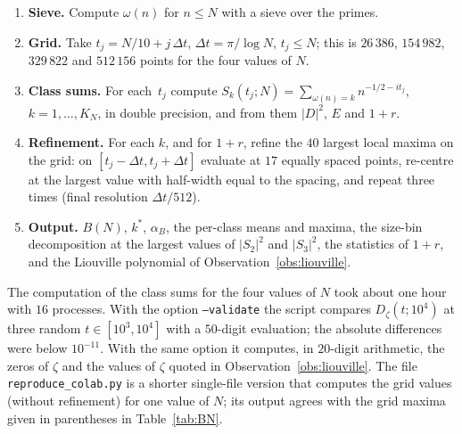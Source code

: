 \documentclass[11pt]{amsart}
\theoremstyle{definition}
\theoremstyle{remark}
\begin{document}
\begin{enumerate}
  \item \textbf{Sieve.} Compute $\omega(n)$ for $n \le N$ with a sieve
    over the primes.
  \item \textbf{Grid.} Take $t_j=N/10+j\,\Delta t$,
    $\Delta t = \pi / \log N$, $t_j\le N$; this is $26\,386$, $154\,982$, $329\,822$ and $512\,156$ points for
    the four values of $N$.
  \item \textbf{Class sums.} For each~$t_j$ compute
    $S_k(t_j;N) = \sum_{\omega(n)=k} n^{-1/2-it_j}$, $k = 1, \ldots, K_N$,
    in double precision, and from them $|D|^2$, $E$ and $1+r$.
  \item \textbf{Refinement.} For each $k$, and for $1+r$, refine the $40$
    largest local maxima on the grid: on $[t_j-\Delta t,t_j+\Delta t]$
    evaluate at $17$ equally spaced points, re-centre at the largest
    value with half-width equal to the spacing, and repeat three times
    (final resolution $\Delta t/512$).
  \item \textbf{Output.} $B(N)$, $k^*$, $\alpha_B$, the per-class means
    and maxima, the size-bin decomposition at the largest values of
    $|S_2|^2$ and $|S_3|^2$, the statistics of $1+r$, and the Liouville
    polynomial of Observation~\ref{obs:liouville}.
\end{enumerate}

The computation of the class sums for the four values of $N$ took about
one hour with $16$ processes.  With the option \texttt{--validate}
the script compares $D_\zeta(t;10^4)$ at three random $t\in[10^3,10^4]$
with a $50$-digit evaluation; the absolute differences were below
$10^{-11}$.  With the same option it computes, in $20$-digit arithmetic,
the zeros of $\zeta$ and the values of $\zeta$ quoted in
Observation~\ref{obs:liouville}.  The file \texttt{reproduce\_colab.py} is a shorter
single-file version that computes the grid values (without refinement)
for one value of $N$; its output agrees with the grid maxima given in
parentheses in Table~\ref{tab:BN}.
\end{document}
